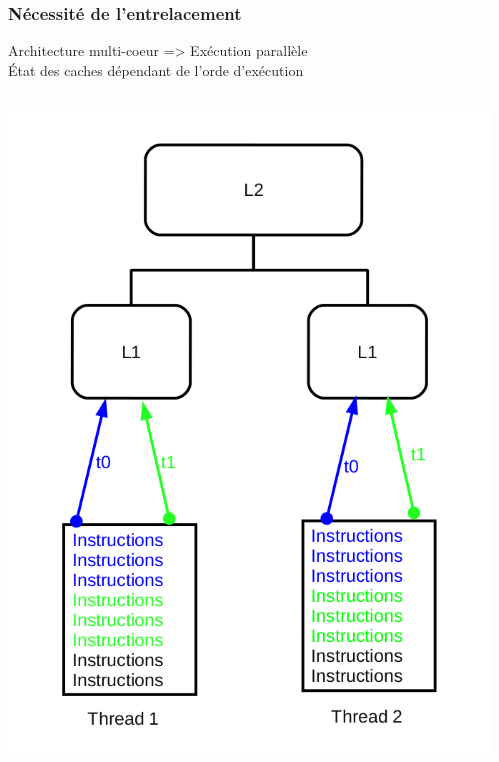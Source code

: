 \begin{frame}
 \frametitle{Nécessité de l'entrelacement}
 Architecture multi-coeur => Exécution parallèle\\
 \'Etat des caches dépendant de l'orde d'exécution
 \begin{columns}[T]
   \begin{column}{.5\textwidth}
     \includegraphics[scale=0.25]{images/schema_entrelacement.png}
   \end{column}
   \begin{column}{.5\textwidth}

\end{column}
\end{columns}
\end{frame}
